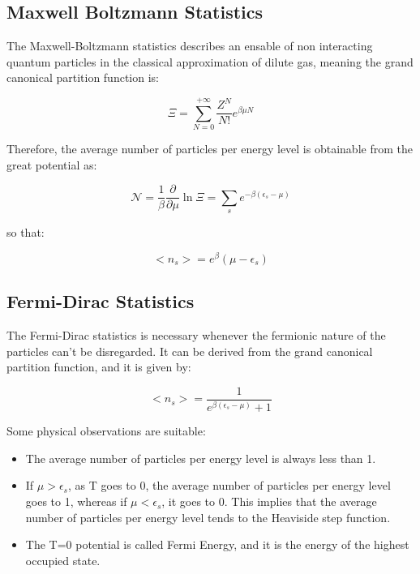 \documentclass{article}
\begin{document}
\subsection{Maxwell Boltzmann Statistics}

The Maxwell-Boltzmann statistics describes an ensable of non interacting quantum particles in the classical
approximation of dilute gas, meaning the grand canonical partition function is:

\begin{equation}
    \Xi=\sum_{N=0}^{+\infty}\frac{Z^N}{N!}e^{\beta\mu N}
\end{equation}

Therefore, the average number of particles per energy level is obtainable from the great potential as:

\begin{equation}
    \mathcal{N}=\frac{1}{\beta}\frac{\partial}{\partial \mu}\ln{\Xi}=\sum_{s} e^{-\beta(\epsilon_s-\mu)}
\end{equation}

so that:

\begin{equation}
    <n_s>=e^\beta(\mu-\epsilon_s)
\end{equation}


\subsection{Fermi-Dirac Statistics}

The Fermi-Dirac statistics is necessary whenever the fermionic nature of the particles
can't be disregarded.
It can be derived from the grand canonical partition function, and it is given by:

\begin{equation}
    <n_s>=\frac{1}{e^{\beta(\epsilon_s-\mu)}+1}
\end{equation}

Some physical observations are suitable:

\begin{itemize}
    \item The average number of particles per energy level is always less than 1.
    \item If $\mu>\epsilon_s$, as T goes to 0, the average number of particles per energy level goes to 1,
          whereas if $\mu<\epsilon_s$, it goes to 0. This implies that the average number of particles per energy level tends to
          the Heaviside step function.
    \item The T=0 potential is called Fermi Energy, and it is the energy of the highest occupied state.
\end{itemize}
\end{document}

